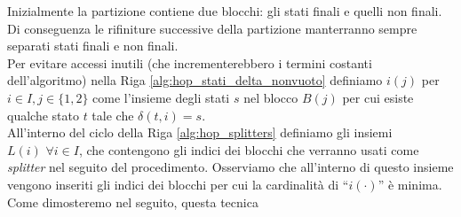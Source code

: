 Inizialmente la partizione contiene due blocchi: gli stati finali e quelli non finali. Di conseguenza le rifiniture successive della partizione manterranno sempre separati stati finali e non finali.\\
Per evitare accessi inutili (che incrementerebbero i termini costanti dell'algoritmo) nella Riga \ref{alg:hop_stati_delta_nonvuoto} definiamo $i(j)$ per $i \in I, j \in \{1,2\}$ come l'insieme degli stati $s$ nel blocco $B(j)$ per cui esiste qualche stato $t$ tale che $\delta(t,i) = s$.\\
All'interno del ciclo della Riga \ref{alg:hop_splitters} definiamo gli insiemi $L(i)\,\, \forall i \in I$, che contengono gli indici dei blocchi che verranno usati come \emph{splitter} nel seguito del procedimento. Osserviamo che all'interno di questo insieme vengono inseriti gli indici dei blocchi per cui la cardinalità di ``$i(\cdot)$'' è minima. Come dimosteremo nel seguito, questa tecnica

